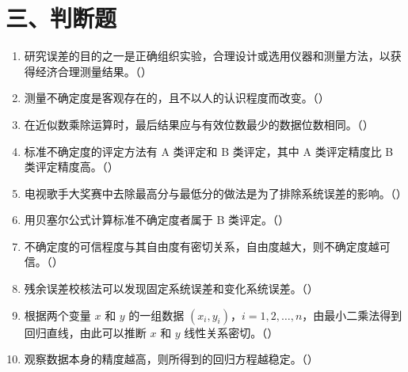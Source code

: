 \documentclass[UTF8,12pt,a4paper]{ctexart}
\begin{document}
\section*{三、判断题}
\begin{enumerate}[label=\arabic*、]
\item 研究误差的目的之一是正确组织实验，合理设计或选用仪器和测量方法，以获得经济合理测量结果。（\quad）
\item 测量不确定度是客观存在的，且不以人的认识程度而改变。（\quad）
\item 在近似数乘除运算时，最后结果应与有效位数最少的数据位数相同。（\quad）
\item 标准不确定度的评定方法有 A 类评定和 B 类评定，其中 A 类评定精度比 B 类评定精度高。（\quad）
\item 电视歌手大奖赛中去除最高分与最低分的做法是为了排除系统误差的影响。（\quad）
\item 用贝塞尔公式计算标准不确定度者属于 B 类评定。（\quad）
\item 不确定度的可信程度与其自由度有密切关系，自由度越大，则不确定度越可信。（\quad）
\item 残余误差校核法可以发现固定系统误差和变化系统误差。（\quad）
\item 根据两个变量 $x$ 和 $y$ 的一组数据 $(x_i,y_i)$，$i=1,2,\ldots,n$，由最小二乘法得到回归直线，由此可以推断 $x$ 和 $y$ 线性关系密切。（\quad）
\item 观察数据本身的精度越高，则所得到的回归方程越稳定。（\quad）
\end{enumerate}
\end{document}
